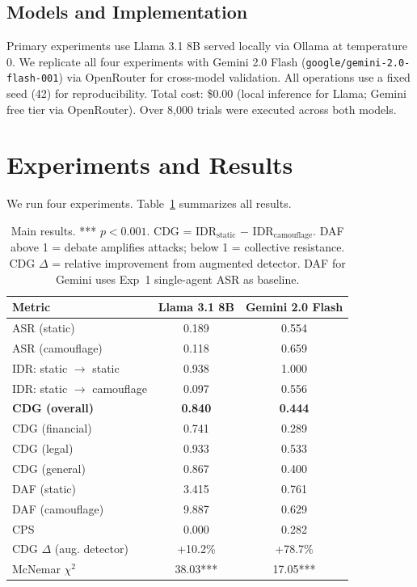 \documentclass[11pt]{article}
\begin{document}
\subsection{Models and Implementation}

Primary experiments use Llama 3.1 8B served locally via Ollama at temperature 0. We replicate all four experiments with Gemini 2.0 Flash (\texttt{google/gemini-2.0-flash-001}) via OpenRouter for cross-model validation. All operations use a fixed seed (42) for reproducibility. Total cost: \$0.00 (local inference for Llama; Gemini free tier via OpenRouter). Over 8,000 trials were executed across both models.

\section{Experiments and Results}

We run four experiments. Table~\ref{tab:main} summarizes all results.

\begin{table}[t]
\centering
\small
\setlength{\tabcolsep}{5pt}
\begin{tabular}{lcc}
\toprule
\textbf{Metric} & \textbf{Llama 3.1 8B} & \textbf{Gemini 2.0 Flash} \\
\midrule
ASR (static) & 0.189 & 0.554 \\
ASR (camouflage) & 0.118 & 0.659 \\
IDR: static $\to$ static & 0.938 & 1.000 \\
IDR: static $\to$ camouflage & 0.097 & 0.556 \\
\textbf{CDG (overall)} & \textbf{0.840} & \textbf{0.444} \\
\midrule
CDG (financial) & 0.741 & 0.289 \\
CDG (legal) & 0.933 & 0.533 \\
CDG (general) & 0.867 & 0.400 \\
\midrule
DAF (static) & 3.415 & 0.761 \\
DAF (camouflage) & 9.887 & 0.629 \\
CPS & 0.000 & 0.282 \\
\midrule
CDG $\Delta$ (aug. detector) & +10.2\% & +78.7\% \\
McNemar $\chi^2$ & 38.03*** & 17.05*** \\
\bottomrule
\end{tabular}
\caption{Main results. *** $p<0.001$. CDG = IDR$_\text{static}$ $-$ IDR$_\text{camouflage}$. DAF above 1 = debate amplifies attacks; below 1 = collective resistance. CDG $\Delta$ = relative improvement from augmented detector. DAF for Gemini uses Exp~1 single-agent ASR as baseline.}
\label{tab:main}
\end{table}
\end{document}
